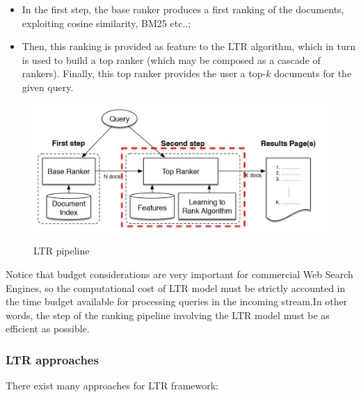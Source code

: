 \begin{itemize}
    \item In the first step, the base ranker produces a first ranking of the documents, exploiting cosine similarity, BM25 etc..;
    \item Then, this ranking is provided as feature to the LTR algorithm, which in turn is used to build a top ranker (which may be composed as a cascade of rankers). Finally, this top ranker provides the user a top-$k$ documents for the given query.
\end{itemize}

\begin{figure}[h!]
		\centering
        \includegraphics[scale = 1.8]{img/ltr2.jpg}
		\label{ltr2}
        \caption{LTR pipeline}
\end{figure}

Notice that budget considerations are very important for commercial Web Search Engines, so the computational cost of LTR model must be strictly accounted in the time budget available for processing queries in the incoming stream.In other words, the step of the ranking pipeline involving the LTR model must be as efficient as possible.

\subsubsection{LTR approaches}
There exist many approaches for LTR framework:

